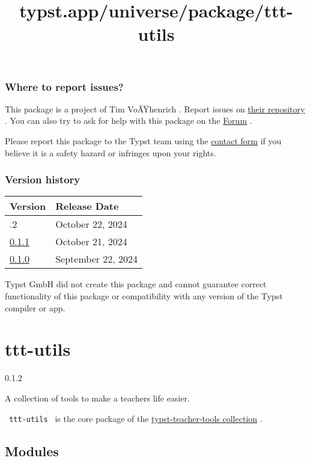 \subsubsection{Where to report issues?}\label{where-to-report-issues}

This package is a project of Tim VoÃŸhenrich . Report issues on
\href{https://github.com/T1mVo/shadowed}{their repository} . You can
also try to ask for help with this package on the
\href{https://forum.typst.app}{Forum} .

Please report this package to the Typst team using the
\href{https://typst.app/contact}{contact form} if you believe it is a
safety hazard or infringes upon your rights.

\label{versions}
\subsubsection{Version history}\label{version-history}

\begin{longtable}[]{@{}ll@{}}
\toprule\noalign{}
Version & Release Date \\
\midrule\noalign{}
\endhead
\bottomrule\noalign{}
\endlastfoot
0.1.2 & October 22, 2024 \\
\href{https://typst.app/universe/package/shadowed/0.1.1/}{0.1.1} &
October 21, 2024 \\
\href{https://typst.app/universe/package/shadowed/0.1.0/}{0.1.0} &
September 22, 2024 \\
\end{longtable}

Typst GmbH did not create this package and cannot guarantee correct
functionality of this package or compatibility with any version of the
Typst compiler or app.


\title{typst.app/universe/package/ttt-utils}

\label{banner}
\section{ttt-utils}\label{ttt-utils}

{ 0.1.2 }

A collection of tools to make a teachers life easier.

\label{readme}
\texttt{\ ttt-utils\ } is the core package of the
\href{https://github.com/jomaway/typst-teacher-templates}{typst-teacher-tools
collection} .

\subsection{Modules}\label{modules}

